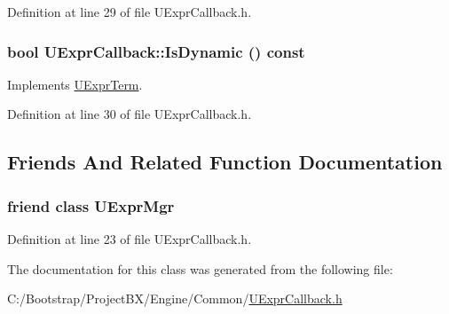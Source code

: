 Definition at line 29 of file UExprCallback.h.\hypertarget{class_u_expr_callback_eaae0abe4fc4f6c9a1bda718a6d61977}{
\subsubsection[{IsDynamic}]{\setlength{\rightskip}{0pt plus 5cm}bool UExprCallback::IsDynamic () const}}
\label{class_u_expr_callback_eaae0abe4fc4f6c9a1bda718a6d61977}




Implements \hyperlink{class_u_expr_term_0b0a24c60fecb1a7388e4b01e2f73572}{UExprTerm}.

Definition at line 30 of file UExprCallback.h.

\subsection{Friends And Related Function Documentation}
\hypertarget{class_u_expr_callback_aba1a84b84f2ff7cab4b76539215bd34}{
\subsubsection[{UExprMgr}]{\setlength{\rightskip}{0pt plus 5cm}friend class {\bf UExprMgr}}}
\label{class_u_expr_callback_aba1a84b84f2ff7cab4b76539215bd34}




Definition at line 23 of file UExprCallback.h.

The documentation for this class was generated from the following file:\begin{CompactItemize}
\item 
C:/Bootstrap/ProjectBX/Engine/Common/\hyperlink{_u_expr_callback_8h}{UExprCallback.h}\end{CompactItemize}
